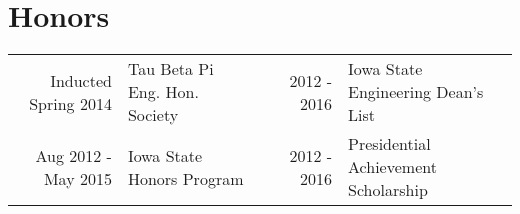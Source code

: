 \documentclass[a4paper,10pt]{article}
\begin{document}
\section{Honors}

\begin{tabular*}{\textwidth}{r | l c r | l}

  Inducted Spring 2014 & Tau Beta Pi Eng. Hon. Society                     & & %
           2012 - 2016 & Iowa State Engineering Dean's List                                       \\
   Aug 2012 - May 2015 & Iowa State Honors Program                         & & %
           2012 - 2016 & Presidential Achievement Scholarship                                     \\

\end{tabular*}
\end{document}

